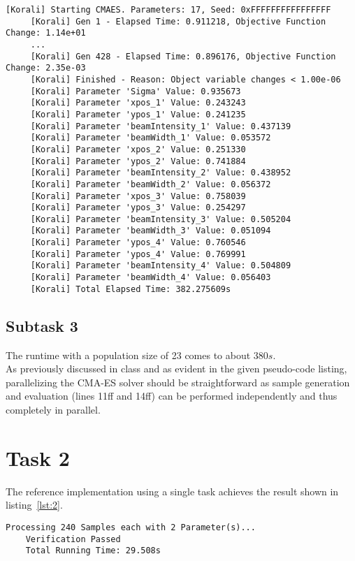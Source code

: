\documentclass[11pt,a4paper]{article}
\begin{document}
\begin{lstlisting}[basicstyle=\tiny, frame=single, caption={Task 1: Korali/CMA-ES output: Most likely (x,y) position and characteristics (beam width, intensity) of each of the robotic torches.}, label={lst:1}]
	 [Korali] Starting CMAES. Parameters: 17, Seed: 0xFFFFFFFFFFFFFFFF
	 [Korali] Gen 1 - Elapsed Time: 0.911218, Objective Function Change: 1.14e+01
	 ...
	 [Korali] Gen 428 - Elapsed Time: 0.896176, Objective Function Change: 2.35e-03
	 [Korali] Finished - Reason: Object variable changes < 1.00e-06
	 [Korali] Parameter 'Sigma' Value: 0.935673
	 [Korali] Parameter 'xpos_1' Value: 0.243243
	 [Korali] Parameter 'ypos_1' Value: 0.241235
	 [Korali] Parameter 'beamIntensity_1' Value: 0.437139
	 [Korali] Parameter 'beamWidth_1' Value: 0.053572
	 [Korali] Parameter 'xpos_2' Value: 0.251330
	 [Korali] Parameter 'ypos_2' Value: 0.741884
	 [Korali] Parameter 'beamIntensity_2' Value: 0.438952
	 [Korali] Parameter 'beamWidth_2' Value: 0.056372
	 [Korali] Parameter 'xpos_3' Value: 0.758039
	 [Korali] Parameter 'ypos_3' Value: 0.254297
	 [Korali] Parameter 'beamIntensity_3' Value: 0.505204
	 [Korali] Parameter 'beamWidth_3' Value: 0.051094
	 [Korali] Parameter 'ypos_4' Value: 0.760546
	 [Korali] Parameter 'ypos_4' Value: 0.769991
	 [Korali] Parameter 'beamIntensity_4' Value: 0.504809
	 [Korali] Parameter 'beamWidth_4' Value: 0.056403
	 [Korali] Total Elapsed Time: 382.275609s	 
\end{lstlisting}

\subsection{Subtask 3}
The runtime with a population size of 23 comes to about $380s$.\\
As previously discussed in class and as evident in the given pseudo-code listing,
parallelizing the CMA-ES solver should be straightforward as sample generation and evaluation
(lines 11ff and 14ff) can be performed independently and thus completely in parallel.

\section{Task 2}
The reference implementation using a single task achieves the result shown in listing~\ref{lst:2}.

\begin{lstlisting}[basicstyle=\tiny, frame=single, caption={Task 2: Reference single-task implementation output.}, label={lst:2}]
	Processing 240 Samples each with 2 Parameter(s)...
	Verification Passed
	Total Running Time: 29.508s	 
\end{lstlisting}
\end{document}
